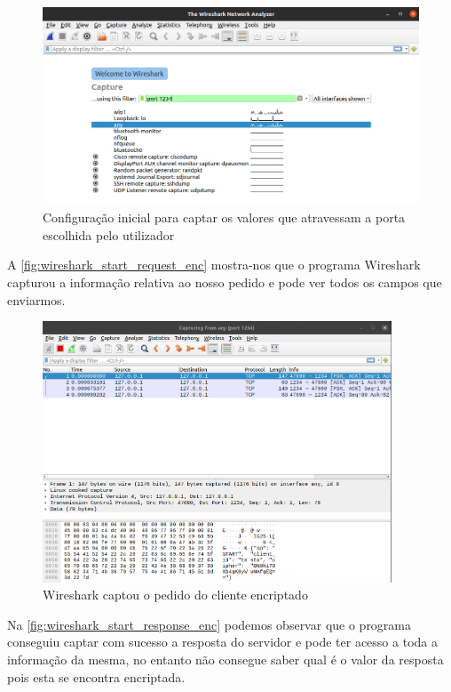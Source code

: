 \documentclass{report}
\begin{document}
\begin{figure}[!h]
\center 
\includegraphics[height=170pt]{img/encripted/config_inicial.png}
\caption{Configuração inicial para captar os valores que atravessam a porta escolhida pelo utilizador}
\label{fig:config_inicial_enc}
\end{figure}

A \autoref{fig:wireshark_start_request_enc} mostra-nos que o programa Wireshark capturou a informação relativa ao nosso pedido e pode ver todos os campos que enviarmos.

\begin{figure}[!h]
\center 
\includegraphics[height=220pt]{img/encripted/wireshark_start_request.png}
\caption{Wireshark captou o pedido do cliente encriptado}
\label{fig:wireshark_start_request_enc}
\end{figure}

Na \autoref{fig:wireshark_start_response_enc} podemos observar que o programa conseguiu captar com sucesso a resposta do servidor e pode ter acesso a toda a informação da mesma, no entanto não consegue saber qual é o valor da resposta pois esta se encontra encriptada.
\end{document}
